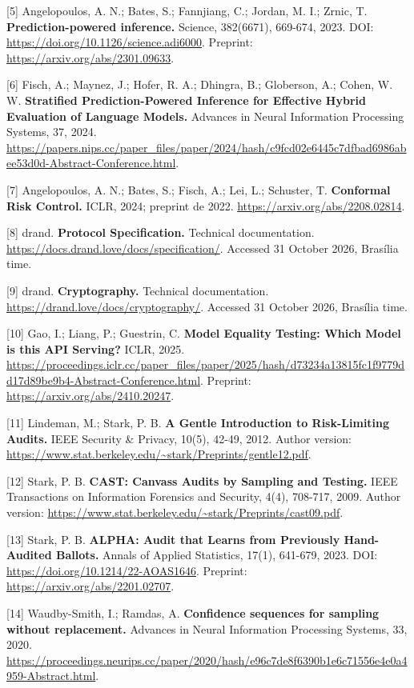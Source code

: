\documentclass[
  10pt,
]{article}
\begin{document}
{[}5{]} Angelopoulos, A. N.; Bates, S.; Fannjiang, C.; Jordan, M. I.;
Zrnic, T. \textbf{Prediction-powered inference.} Science, 382(6671),
669-674, 2023. DOI: \url{https://doi.org/10.1126/science.adi6000}.
Preprint: \url{https://arxiv.org/abs/2301.09633}.

{[}6{]} Fisch, A.; Maynez, J.; Hofer, R. A.; Dhingra, B.; Globerson, A.;
Cohen, W. W. \textbf{Stratified Prediction-Powered Inference for
Effective Hybrid Evaluation of Language Models.} Advances in Neural
Information Processing Systems, 37, 2024.
\url{https://papers.nips.cc/paper_files/paper/2024/hash/c9fcd02e6445c7dfbad6986abee53d0d-Abstract-Conference.html}.

{[}7{]} Angelopoulos, A. N.; Bates, S.; Fisch, A.; Lei, L.; Schuster, T.
\textbf{Conformal Risk Control.} ICLR, 2024; preprint de 2022.
\url{https://arxiv.org/abs/2208.02814}.

{[}8{]} drand. \textbf{Protocol Specification.} Technical documentation.
\url{https://docs.drand.love/docs/specification/}. Accessed 31 October
2026, Brasília time.

{[}9{]} drand. \textbf{Cryptography.} Technical documentation.
\url{https://drand.love/docs/cryptography/}. Accessed 31 October 2026,
Brasília time.

{[}10{]} Gao, I.; Liang, P.; Guestrin, C. \textbf{Model Equality
Testing: Which Model is this API Serving?} ICLR, 2025.
\url{https://proceedings.iclr.cc/paper_files/paper/2025/hash/d73234a13815fc1f9779dd17d89be9b4-Abstract-Conference.html}.
Preprint: \url{https://arxiv.org/abs/2410.20247}.

{[}11{]} Lindeman, M.; Stark, P. B. \textbf{A Gentle Introduction to
Risk-Limiting Audits.} IEEE Security \& Privacy, 10(5), 42-49, 2012.
Author version:
\url{https://www.stat.berkeley.edu/~stark/Preprints/gentle12.pdf}.

{[}12{]} Stark, P. B. \textbf{CAST: Canvass Audits by Sampling and
Testing.} IEEE Transactions on Information Forensics and Security, 4(4),
708-717, 2009. Author version:
\url{https://www.stat.berkeley.edu/~stark/Preprints/cast09.pdf}.

{[}13{]} Stark, P. B. \textbf{ALPHA: Audit that Learns from Previously
Hand-Audited Ballots.} Annals of Applied Statistics, 17(1), 641-679,
2023. DOI: \url{https://doi.org/10.1214/22-AOAS1646}. Preprint:
\url{https://arxiv.org/abs/2201.02707}.

{[}14{]} Waudby-Smith, I.; Ramdas, A. \textbf{Confidence sequences for
sampling without replacement.} Advances in Neural Information Processing
Systems, 33, 2020.
\url{https://proceedings.neurips.cc/paper/2020/hash/e96c7de8f6390b1e6c71556e4e0a4959-Abstract.html}.
\end{document}
